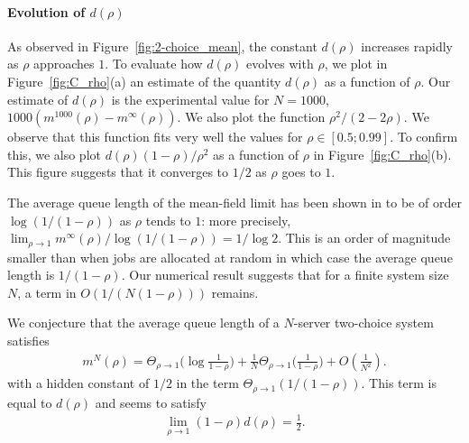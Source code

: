\documentclass[sigconf]{acmart}
\newcommand\p[1]{\left(#1\right)}
\begin{document}
\paragraph*{Evolution of $d(\rho)$}
As observed in Figure~\ref{fig:2-choice_mean}, the constant $d(\rho)$
increases rapidly as $\rho$ approaches $1$.  To evaluate how $d(\rho)$
evolves with $\rho$, we plot in Figure~\ref{fig:C_rho}(a) an estimate
of the quantity $d(\rho)$ as a function of $\rho$. Our estimate of
$d(\rho)$ is the experimental value for $N=1000$,
$1000(m^{1000}(\rho)-m^\infty(\rho))$.  We also plot the function
$\rho^2/(2-2\rho)$.  We observe that this function fits very well the
values for $\rho\in[0.5;0.99]$. To confirm this, we also plot
$d(\rho)(1-\rho)/\rho^2$ as a function of $\rho$ in
Figure~\ref{fig:C_rho}(b). This figure suggests that it converges to
$1/2$ as $\rho$ goes to $1$.

The average queue length of the mean-field limit has been shown in
\cite{mitzenmacher1996power} to be of order $\log (1/(1-\rho))$ as
$\rho$ tends to $1$: more precisely,
$\lim_{\rho\to1}m^\infty(\rho) / \log(1/(1-\rho)) = 1/\log2$.  This is
an order of magnitude smaller than when jobs are allocated at random
in which case the average queue length is $1/(1-\rho)$. Our numerical
result suggests that for a finite system size $N$, a term in
$O(1/(N(1-\rho)))$ remains.

We conjecture that the average queue length of a $N$-server two-choice
system satisfies 
\begin{align*}
  m^N(\rho) = \Theta_{\rho\to1}\Big(\log\frac1{1-\rho}\Big)
  + \frac{1}{N}\Theta_{\rho\to1}\Big(\frac{1}{1-\rho}\Big) +
  O\p{\frac1{N^2}}. 
\end{align*}
with a hidden constant of $1/2$ in the term
$\Theta_{\rho\to1}(1/(1-\rho))$. This term is equal to $d(\rho)$ and
seems to satisfy
\begin{align*}
  \lim_{\rho\to1}  (1-\rho) d(\rho)  = \frac12.
\end{align*}
\end{document}
